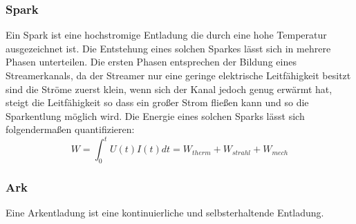 \subsubsection{Spark}
Ein Spark ist eine hochstromige Entladung die durch eine hohe Temperatur ausgezeichnet ist. Die Entstehung eines solchen Sparkes lässt sich in mehrere Phasen unterteilen. Die ersten Phasen entsprechen der Bildung eines Streamerkanals, da der Streamer nur eine geringe elektrische Leitfähigkeit besitzt sind die Ströme zuerst klein, wenn sich der Kanal jedoch genug erwärmt hat, steigt die Leitfähigkeit so dass ein großer Strom fließen kann und so die Sparkentlung möglich wird.
Die Energie eines solchen Sparks lässt sich folgendermaßen quantifizieren:
\begin{equation}
    W = \int_{0}^{t} U(t)I(t)dt = W_{therm} + W_{strahl} + W_{mech}
\end{equation}
\subsubsection{Ark}
Eine Arkentladung ist eine kontinuierliche und selbsterhaltende Entladung.
%
